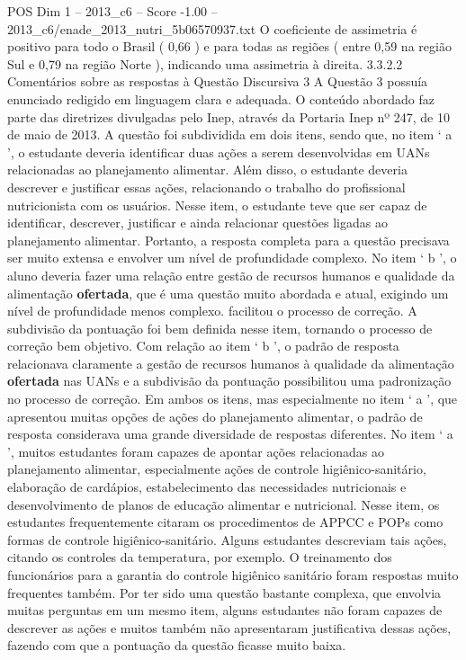 \begin{textsample}{POS Dim 1 – 2013\_c6 – Score -1.00 – 2013\_c6/enade\_2013\_nutri\_5b06570937.txt}
O coeficiente de assimetria é positivo para todo o Brasil ( 0,66 ) e para todas as regiões ( entre 0,59 na região Sul e 0,79 na região Norte ), indicando uma assimetria à direita. 3.3.2.2 Comentários sobre as respostas à Questão Discursiva 3 A Questão 3 possuía enunciado redigido em linguagem clara e adequada.
O conteúdo abordado faz parte das diretrizes divulgadas pelo Inep, através da Portaria Inep nº 247, de 10 de maio de 2013.
A questão foi subdividida em dois itens, sendo que, no item ‘ a ’, o estudante deveria identificar duas ações a serem desenvolvidas em UANs relacionadas ao planejamento alimentar.
Além disso, o estudante deveria descrever e justificar essas ações, relacionando o trabalho do profissional nutricionista com os usuários.
Nesse item, o estudante teve que ser capaz de identificar, descrever, justificar e ainda relacionar questões ligadas ao planejamento alimentar.
Portanto, a resposta completa para a questão precisava ser muito extensa e envolver um nível de profundidade complexo.
No item ‘ b ’, o aluno deveria fazer uma relação entre gestão de recursos humanos e qualidade da alimentação \textbf{ofertada}, que é uma questão muito abordada e atual, exigindo um nível de profundidade menos complexo. facilitou o processo de correção.
A subdivisão da pontuação foi bem definida nesse item, tornando o processo de correção bem objetivo.
Com relação ao item ‘ b ’, o padrão de resposta relacionava claramente a gestão de recursos humanos à qualidade da alimentação \textbf{ofertada} nas UANs e a subdivisão da pontuação possibilitou uma padronização no processo de correção.
Em ambos os itens, mas especialmente no item ‘ a ’, que apresentou muitas opções de ações do planejamento alimentar, o padrão de resposta considerava uma grande diversidade de respostas diferentes.
No item ‘ a ’, muitos estudantes foram capazes de apontar ações relacionadas ao planejamento alimentar, especialmente ações de controle higiênico-sanitário, elaboração de cardápios, estabelecimento das necessidades nutricionais e desenvolvimento de planos de educação alimentar e nutricional.
Nesse item, os estudantes frequentemente citaram os procedimentos de APPCC e POPs como formas de controle higiênico-sanitário.
Alguns estudantes descreviam tais ações, citando os controles da temperatura, por exemplo.
O treinamento dos funcionários para a garantia do controle higiênico sanitário foram respostas muito frequentes também.
Por ter sido uma questão bastante complexa, que envolvia muitas perguntas em um mesmo item, alguns estudantes não foram capazes de descrever as ações e muitos também não apresentaram justificativa dessas ações, fazendo com que a pontuação da questão ficasse muito baixa.

\end{textsample}
